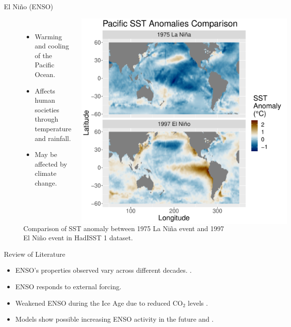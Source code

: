 \documentclass{beamer}
\begin{document}
\begin{frame}{El Niño (ENSO)}
  \begin{figure}
    \begin{columns}
      \begin{itemize}
      \item Warming and cooling of the Pacific Ocean.
      \item Affects human societies through temperature and rainfall. \citep{ropelewski1987global}
      \item May be affected by climate change.
      \end{itemize}
      \caption{Comparison of SST anomaly between 1975 La Niña event and 1997 El Niño event in HadISST 1 dataset. \citep{rayner2003global}}
      \includegraphics[width = \textwidth]{figures/intro_fig.pdf}
    \end{columns}
  \end{figure}
\end{frame}

\begin{frame}{Review of Literature}
  \begin{itemize}
  \item ENSO's properties observed vary across different decades. \citep{lubbecke2014assessing}.
  \item ENSO responds to external forcing.
  \item Weakened ENSO during the Ice Age due to reduced CO$_2$ levels \citep{zhu2017reduced}.
  \item Models show possible increasing ENSO activity in the future \citep{zheng2017response} and \citep{maher2018enso}.
  \end{itemize}
\end{frame}
\end{document}
